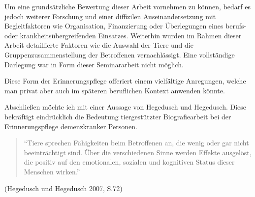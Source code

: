 Um eine grundsätzliche Bewertung dieser Arbeit vornehmen zu können, bedarf es jedoch weiterer Forschung und einer diffizilen Auseinandersetzung mit Begleitfaktoren wie Organisation, Finanzierung oder Überlegungen eines berufs- oder krankheitsübergreifenden Einsatzes. Weiterhin wurden im Rahmen dieser Arbeit detaillierte Faktoren wie die Auswahl der Tiere und die Gruppenzusammenstellung der Betroffenen vernachlässigt. Eine vollständige Darlegung war in Form dieser Seminararbeit nicht möglich. 

Diese Form der Erinnerungspflege offeriert einem vielfältige Anregungen, welche man privat aber auch im späteren beruflichen Kontext anwenden könnte.

Abschließen möchte ich mit einer Aussage von Hegedusch und Hegedusch. Diese bekräftigt eindrücklich die Bedeutung tiergestützter Biografiearbeit bei der Erinnerungspflege demenzkranker Personen.

\begin{quotation}
"`Tiere sprechen Fähigkeiten beim Betroffenen an, die wenig oder gar nicht beeinträchtigt sind. Über die verschiedenen Sinne werden Effekte ausgelöst, die positiv auf den emotionalen, sozialen und kognitiven Status dieser Menschen wirken."'
\end{quotation}
\begin{flushright}
(Hegedusch und Hegedusch 2007, S.72)
\end{flushright}